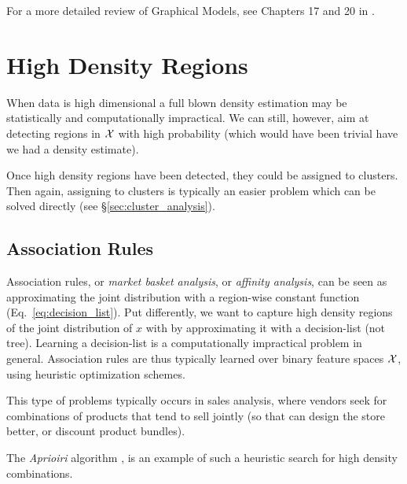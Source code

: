 For a more detailed review of Graphical Models, see Chapters 17 and 20 in \cite{wasserman_all_2004}. 






\section{High Density Regions}
\label{sec:high_density}

When data is high dimensional a full blown density estimation may be statistically and computationally impractical.
We can still, however, aim at detecting regions in $\mathcal{X}$ with high probability (which would have been trivial have we had a density estimate).

Once high density regions have been detected, they could be assigned to clusters. Then again, assigning to clusters is typically an easier problem which can be solved directly (see \S\ref{sec:cluster_analysis}).



\subsection{Association Rules}
\label{sec:association}
Association rules, or \emph{market basket analysis}, or \emph{affinity analysis}, can be seen as approximating the joint distribution with a region-wise constant function (Eq.~\ref{eq:decision_list}).
Put differently, we want to capture high density regions of the joint distribution of $x$ with by approximating it with a decision-list (not tree).
Learning a decision-list is a computationally impractical problem in general. Association rules are thus typically learned over binary feature spaces $\mathcal{X}$, using heuristic optimization schemes.

This type of problems typically occurs in sales analysis, where vendors seek for combinations of products that tend to sell jointly (so that can design the store better, or discount product bundles).

The \emph{Aprioiri} algorithm \cite{agraval_fast_1994}, is an example of such a heuristic search for high density combinations.

